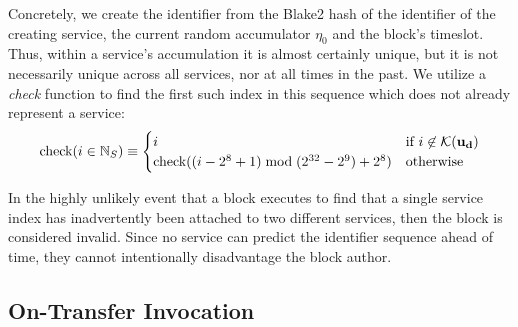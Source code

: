 Concretely, we create the identifier from the Blake2 hash of the identifier of the creating service, the current random accumulator $\eta_0$ and the block's timeslot. Thus, within a service's accumulation it is almost certainly unique, but it is not necessarily unique across all services, nor at all times in the past. We utilize a \emph{check} function to find the first such index in this sequence which does not already represent a service:
\begin{equation}
  \text{check}(i \in \mathbb{N}_S) \equiv \begin{cases}
    i &\text{if } i \not\in \mathcal{K}(\mathbf{u}_\mathbf{d}) \\
    \text{check}((i - 2^8 + 1) \bmod (2^{32}-2^9) + 2^8)&\text{otherwise}
  \end{cases}
\end{equation}

\nb In the highly unlikely event that a block executes to find that a single service index has inadvertently been attached to two different services, then the block is considered invalid. Since no service can predict the identifier sequence ahead of time, they cannot intentionally disadvantage the block author.

\subsection{On-Transfer Invocation}\label{sec:ontransferinvocation}

